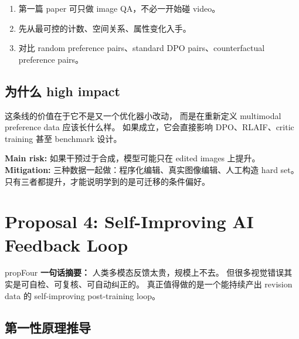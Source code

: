 \documentclass[12pt,a4paper]{article}
\begin{document}
\begin{expbox}
\begin{enumerate}[leftmargin=2em]
  \item 第一篇 paper 可只做 image QA，不必一开始碰 video。
  \item 先从最可控的计数、空间关系、属性变化入手。
  \item 对比 random preference pairs、standard DPO pairs、counterfactual preference pairs。
\end{enumerate}
\end{expbox}

\subsection{为什么 high impact}

这条线的价值在于它不是又一个优化器小改动，
而是在重新定义 multimodal preference data 应该长什么样。
如果成立，它会直接影响 DPO、RLAIF、critic training 甚至 benchmark 设计。

\begin{riskbox}
\textbf{Main risk:}
如果干预过于合成，模型可能只在 edited images 上提升。\\
\textbf{Mitigation:}
三种数据一起做：程序化编辑、真实图像编辑、人工构造 hard set。
只有三者都提升，才能说明学到的是可迁移的条件偏好。
\end{riskbox}

\newpage
\section{Proposal 4: Self-Improving AI Feedback Loop}

\begin{proposalbox}{propFour}
\textbf{一句话摘要：}
人类多模态反馈太贵，规模上不去。
但很多视觉错误其实是可自检、可复核、可自动纠正的。
真正值得做的是一个能持续产出 revision data 的 self-improving post-training loop。
\end{proposalbox}

\subsection{第一性原理推导}
\end{document}
